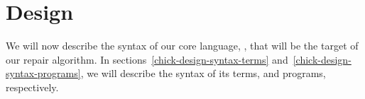 \section{Design}

We will now describe the syntax of our core language, \Chick{}, that will be the
target of our repair algorithm.  In sections~\ref{chick-design-syntax-terms}
and~\ref{chick-design-syntax-programs}, we will describe the syntax of its
terms, and programs, respectively.






